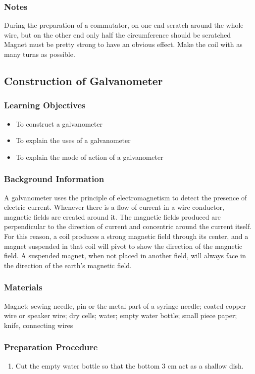 \subsubsection*{Notes}
During the preparation of a commutator, on one end scratch around the whole wire, but on the other end only half the circumference should be scratched
Magnet must be pretty strong to have an obvious effect. Make the coil with as many turns as possible.  

\subsection{Construction of Galvanometer}

\subsubsection*{Learning Objectives}
\begin{itemize}
\item{To construct a galvanometer}
\item{To explain the uses of a galvanometer}
\item{To explain the mode of action of a galvanometer}
\end{itemize}

\subsubsection*{Background Information}
A galvanometer uses the principle of electromagnetism to detect the presence of electric current. Whenever there is a flow of current in a wire conductor, magnetic fields are created around it. The magnetic fields produced are perpendicular to the direction of current and concentric around the current itself. For this reason, a coil produces a strong magnetic field through its center, and a magnet suspended in that coil will pivot to show the direction of the magnetic field. A suspended magnet, when not placed in another field, will always face in the direction of the earth's magnetic field.  

\subsubsection*{Materials}
Magnet; sewing needle, pin or the metal part of a syringe needle; coated copper wire or speaker wire; dry cells; water; empty water bottle; small piece paper; knife, connecting wires

\subsubsection*{Preparation Procedure}
\begin{enumerate}
\item{Cut the empty water bottle so that the bottom 3 cm act as a shallow dish.} 
\end{enumerate}

